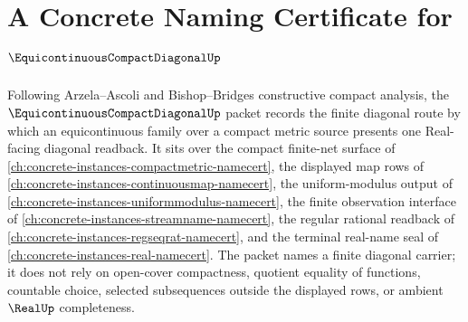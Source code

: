 \chapter{A Concrete Naming Certificate for $\EquicontinuousCompactDiagonalUp$}
\label{ch:concrete-instances-equicontinuous-compact-diagonal-namecert}

Following Arzela--Ascoli and Bishop--Bridges constructive compact analysis, the $\EquicontinuousCompactDiagonalUp$ packet records the finite diagonal route by which an equicontinuous family over a compact metric source presents one Real-facing diagonal readback. It sits over the compact finite-net surface of \autoref{ch:concrete-instances-compactmetric-namecert}, the displayed map rows of \autoref{ch:concrete-instances-continuousmap-namecert}, the uniform-modulus output of \autoref{ch:concrete-instances-uniformmodulus-namecert}, the finite observation interface of \autoref{ch:concrete-instances-streamname-namecert}, the regular rational readback of \autoref{ch:concrete-instances-regseqrat-namecert}, and the terminal real-name seal of \autoref{ch:concrete-instances-real-namecert}. The packet names a finite diagonal carrier; it does not rely on open-cover compactness, quotient equality of functions, countable choice, selected subsequences outside the displayed rows, or ambient $\RealUp$ completeness.

